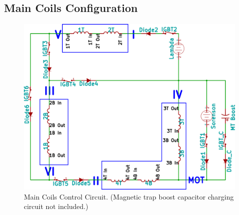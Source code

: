 \subsection{Main Coils Configuration}\label{exp:coil}
\begin{figure}
  \begin{center}
    \includegraphics[width=15cm]{coil.png}
  \end{center}
  \caption{Main Coils Control Circuit. (Magnetic trap boost capacitor charging circuit not included.)}
  \label{exp:coil-control}
\end{figure}
